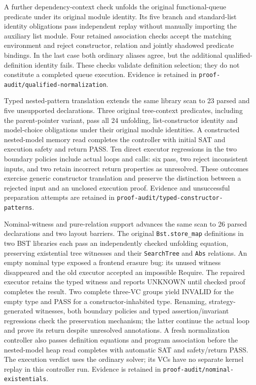 A further dependency-context check unfolds the original functional-queue
predicate under its original module identity. Its five branch and standard-list
identity obligations pass independent replay without manually importing the
auxiliary list module. Four retained association checks accept the matching
environment and reject constructor, relation and jointly shadowed predicate
bindings. In the last case both ordinary aliases agree, but the additional
qualified-definition identity fails. These checks validate definition selection;
they do not constitute a completed queue execution. Evidence is retained in
\texttt{proof-audit/qualified-normalization}.

Typed nested-pattern translation extends the same library scan to 23 parsed
and five unsupported declarations. Three original tree-context predicates,
including the parent-pointer variant, pass all 24 unfolding, list-constructor
identity and model-choice obligations under their original module identities.
A constructed nested-model memory read completes the controller with initial
SAT and execution safety and return PASS. Ten direct executor regressions in
the two boundary policies include actual loops and calls: six pass, two reject
inconsistent inputs, and two retain incorrect return properties as unresolved.
These outcomes exercise generic constructor translation and preserve the
distinction between a rejected input and an unclosed execution proof.
Evidence and unsuccessful preparation attempts are retained in
\texttt{proof-audit/typed-constructor-patterns}.

Nominal-witness and pure-relation support advances the same scan to 26 parsed
declarations and two layout barriers. The original \texttt{Bst.store\_map}
definitions in two BST libraries each pass an independently checked unfolding
equation, preserving existential tree witnesses and their \texttt{SearchTree}
and \texttt{Abs} relations. An empty nominal type exposed a frontend erasure
bug: its unused witness disappeared and the old executor accepted an impossible
Require. The repaired executor retains the typed witness and reports UNKNOWN
until checked proof completes the result. Two complete three-VC groups yield
INVALID for the empty type and PASS for a constructor-inhabited type.
Renaming, strategy-generated witnesses, both boundary policies and typed
assertion/invariant regressions check the preservation mechanism; the latter
continue the actual loop and prove its return despite unresolved annotations.
A fresh normalization controller also passes definition equations and program
association before the nested-model heap read completes with automatic SAT
and safety/return PASS. The execution verdict uses the ordinary solver; its
VCs have no separate kernel replay in this controller run. Evidence is retained
in \texttt{proof-audit/nominal-existentials}.

